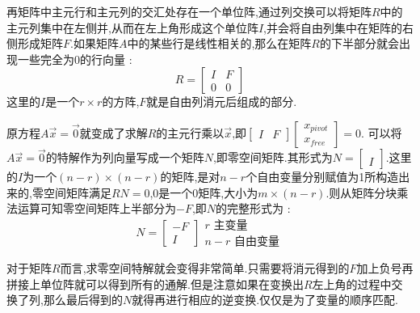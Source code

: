 \documentclass[UTF8,12pt]{ctexbook}
\begin{document}
{{{{{  再矩阵中主元行和主元列的交汇处存在一个单位阵,通过列交换可以将矩阵$R$中的主元列集中在左侧并,从而在左上角形成这个单位阵$I$,并会将自由列集中在矩阵的右侧形成矩阵$F$.如果矩阵$A$中的某些行是线性相关的,那么在矩阵$R$的下半部分就会出现一些完全为0的行向量 : $$
    R
    =
    \begin{bmatrix}
      I & F \\
      0 & 0
    \end{bmatrix}
  $$
  这里的$I$是一个$r \times r$的方阵,$F$就是自由列消元后组成的部分.

  原方程$A\vec{x} = \vec{0}$就变成了求解$R$的主元行乘以$\vec{x}$,即$\begin{bmatrix}
      I & F
    \end{bmatrix}
    \begin{bmatrix}
      x_{pivot} \\
      x_{free}
    \end{bmatrix}
    =
    0
  $.
  可以将$A\vec{x} = \vec{0}$的特解作为列向量写成一个矩阵$N$,即零空间矩阵.其形式为$N = \begin{bmatrix}
      \ \\
      I
    \end{bmatrix}$.这里的$I$为一个$(n - r) \times (n - r)$的矩阵,是对$n - r$个自由变量分别赋值为1所构造出来的,零空间矩阵满足$RN = 0$,$0$是一个$0$矩阵,大小为$m \times (n - r)$.则从矩阵分块乘法运算可知零空间矩阵上半部分为$-F$,即$N$的完整形式为 : $$
    N = \begin{bmatrix}
      -F \\
      I
    \end{bmatrix}
    \begin{matrix}
      r\mbox{\ 主变量} \\
      n-r\mbox{\ 自由变量}
    \end{matrix}
  $$

  对于矩阵$R$而言,求零空间特解就会变得非常简单.只需要将消元得到的$F$加上负号再拼接上单位阵就可以得到所有的通解.但是注意如果在变换出$R$左上角的过程中交换了列,那么最后得到的$N$就得再进行相应的逆变换.仅仅是为了变量的顺序匹配.
}%

}}}}
\end{document}
